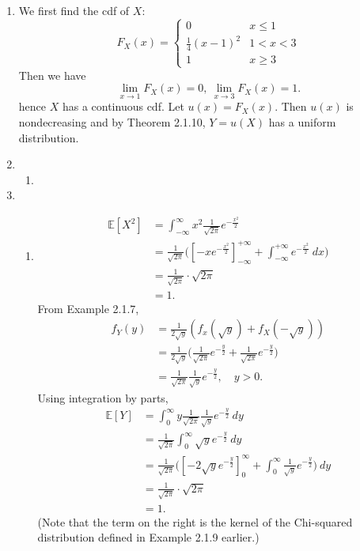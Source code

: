\documentclass{article}
\begin{document}
\begin{enumerate}
    \item We first find the cdf of $X$:
    \[ F_{X}(x) = \begin{cases}
        0 & x \leq 1 \\
        \frac{1}{4}(x - 1)^2 & 1 < x < 3 \\
        1 & x \geq 3
    \end{cases} \]
    Then we have 
    \[ \lim_{x \to 1} F_{X}(x) = 0, \ \lim_{x \to 3} F_{X}(x) = 1. \]
    hence $X$ has a continuous cdf. Let $u(x) = F_{X}(x)$. Then $u(x)$ is nondecreasing and by Theorem 2.1.10, 
    $Y = u(X)$ has a uniform distribution.

    \item \begin{enumerate}
        \item 
    \end{enumerate}

    \item \begin{enumerate}
        \item \begin{align*}
            \mathbb{E}[X^2]
            &= \int_{-\infty}^{\infty} x^2 \frac{1}{\sqrt{2\pi}}e^{-\frac{x^2}{2}} \\
            &= \frac{1}{\sqrt{2\pi}} \Big( [-xe^{-\frac{x^2}{2}}]_{-\infty}^{+\infty} 
            + \int_{-\infty}^{+\infty} e^{-\frac{x^2}{2}} \ dx \Big) \\
            &= \frac{1}{\sqrt{2\pi}} \cdot \sqrt{2\pi} \\
            &= 1.
        \end{align*}
        From Example 2.1.7, 
        \begin{align*}
            f_{Y}(y) 
            &= \frac{1}{2\sqrt{y}} (f_{x}(\sqrt{y}) + f_{X}(-\sqrt{y})) \\
            &= \frac{1}{2\sqrt{y}} \Big( \frac{1}{\sqrt{2\pi}} e^{-\frac{y}{2}} 
            + \frac{1}{\sqrt{2\pi}} e^{-\frac{y}{2}} \Big) \\
            &= \frac{1}{\sqrt{2\pi}} \frac{1}{\sqrt{y}} e^{-\frac{y}{2}}, \quad y > 0.
        \end{align*}
        Using integration by parts, 
        \begin{align*}
            \mathbb{E}[Y]
            &= \int_{0}^{\infty} y \frac{1}{\sqrt{2\pi}} \frac{1}{\sqrt{y}} 
            e^{-\frac{y}{2}} \ dy \\
            &= \frac{1}{\sqrt{2\pi}} \int_{0}^{\infty} \sqrt{y} e^{-\frac{y}{2}} \ dy \\
            &= \frac{1}{\sqrt{2\pi}} \Big( [-2\sqrt{y}e^{-\frac{y}{2}}]_{0}^{\infty} 
            + \int_{0}^{\infty} \frac{1}{\sqrt{y}}e^{-\frac{y}{2}}) \ dy \\
            &= \frac{1}{\sqrt{2\pi}} \cdot \sqrt{2\pi} \\
            &= 1.
        \end{align*}
        (Note that the term on the right is the kernel of the Chi-squared distribution 
        defined in Example 2.1.9 earlier.)


\end{enumerate}
\end{enumerate}
\end{document}

